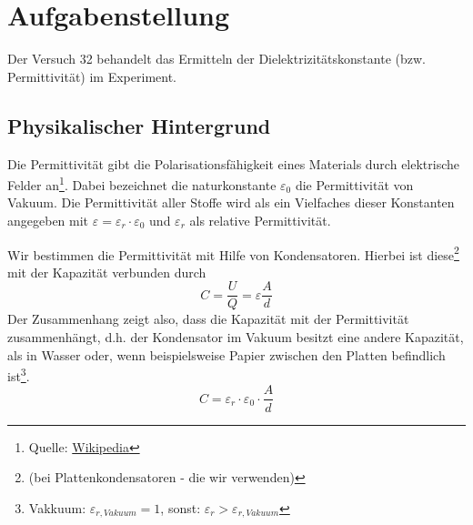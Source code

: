 \documentclass[10pt,a4paper]{article}
\newcommand{\vnr}{32}
\begin{document}
\newpage

\tableofcontents

\vspace{10pt}


\section{Aufgabenstellung}
\begin{flushleft}
Der Versuch \vnr \vspace{1pt} behandelt das Ermitteln der Dielektrizitätskonstante (bzw. Permittivität) im Experiment.
\end{flushleft}

\subsection{Physikalischer Hintergrund}
\begin{flushleft}
Die Permittivität gibt die Polarisationsfähigkeit eines Materials durch elektrische Felder an\footnote{Quelle: \href{https://de.wikipedia.org/wiki/Permittivit\%C3\%A4t}{Wikipedia}}. Dabei bezeichnet die naturkonstante $\varepsilon_0$ die Permittivität von Vakuum. Die Permittivität aller Stoffe wird als ein Vielfaches dieser Konstanten angegeben mit $\varepsilon = \varepsilon_r \cdot \varepsilon_0$ und $\varepsilon_r$ als relative Permittivität.
\end{flushleft}
\begin{flushleft}
Wir bestimmen die Permittivität mit Hilfe von Kondensatoren. Hierbei ist diese\footnote{(bei Plattenkondensatoren - die wir verwenden)} mit der Kapazität verbunden durch
\begin{equation}\label{eq:kapaz}
C = \frac{U}{Q} = \varepsilon \frac{A}{d}
\end{equation}
Der Zusammenhang zeigt also, dass die Kapazität mit der Permittivität zusammenhängt, d.h. der Kondensator im Vakuum besitzt eine andere Kapazität, als in Wasser oder, wenn beispielsweise Papier zwischen den Platten befindlich ist\footnote{Vakkuum: $\varepsilon_{r,Vakuum} = 1$, sonst: $\varepsilon_r > \varepsilon_{r,Vakuum}$}.
\begin{equation}\label{eq:kapa_relp}
C = \varepsilon_r \cdot \varepsilon_0 \cdot \frac{A}{d}
\end{equation}
\end{flushleft}
\end{document}
